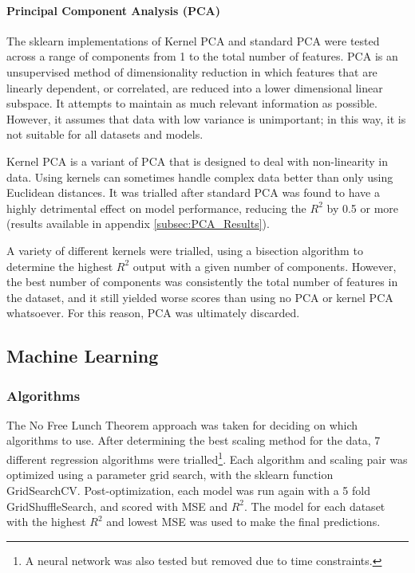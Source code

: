 \documentclass[11pt, titlepage]{article}
\begin{document}
\paragraph*{Principal Component Analysis (PCA)} The sklearn implementations of Kernel PCA\cite{KernelPCA} and standard PCA\cite{PCA} were tested across a range of components from 1 to the total number of features. PCA is an unsupervised method of dimensionality reduction in which features that are linearly dependent, or correlated, are reduced into a lower dimensional linear subspace. It attempts to maintain as much relevant information as possible. However, it assumes that data with low variance is unimportant; in this way, it is not suitable for all datasets and models\cite{PCA_IBM, PCA_UCL, FeatEngForML}.

Kernel PCA is a variant of PCA that is designed to deal with non-linearity in data\cite{KernelPCAPaper}. Using kernels can sometimes handle complex data better than only using Euclidean distances\cite{KPCA_Alt_Paper}. It was trialled after standard PCA was found to have a highly detrimental effect on model performance, reducing the $R^2$ by 0.5 or more (results available in appendix \ref{subsec:PCA_Results}). 

A variety of different kernels were trialled, using a bisection algorithm to determine the highest $R^2$ output with a given number of components. However, the best number of components was consistently the total number of features in the dataset, and it still yielded worse scores than using no PCA or kernel PCA whatsoever. For this reason, PCA was ultimately discarded.

\subsection{Machine Learning}
\label{subsec:ML}
\subsubsection{Algorithms}
\label{subsubsec:Algorithms}
The No Free Lunch Theorem\cite{NoFreeLunch} approach was taken for deciding on which algorithms to use. After determining the best scaling method for the data, 7 different regression algorithms were trialled\footnote{A neural network\cite{pytorch} was also tested but removed due to time constraints.}. Each algorithm and scaling pair was optimized using a parameter grid search, with the sklearn function GridSearchCV\cite{GridSearchCV}. Post-optimization, each model was run again with a 5 fold GridShuffleSearch, and scored with MSE and $R^2$. The model for each dataset with the highest $R^2$ and lowest MSE was used to make the final predictions.
\end{document}
